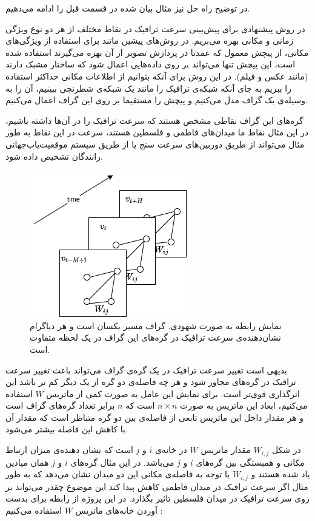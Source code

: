 
در توضیح راه حل نیز مثال بیان شده در قسمت قبل را ادامه می‌دهیم.

در روش پیشنهادی برای پیش‌بینی سرعت ترافیک در نقاط مختلف از هر دو نوع ویژگی زمانی و مکانی بهره می‌بریم.
در روش‌های پیشین مانند  برای استفاده از ویژگی‌های مکانی، از پیچش معمول که عمدتا در پردازش تصویر از آن بهره می‌گیرند استفاده شده است، این پیچش تنها می‌تواند بر روی داده‌هایی اعمال شود که ساختار مشبک دارند (مانند عکس و فیلم).
در این روش برای آنکه بتوانیم از اطلاعات مکانی حداکثر استفاده را ببریم به جای آنکه شبکه‌ی ترافیک را مانند یک شبکه‌‌ی شطرنجی ببینیم،
آن را به وسیله‌ی یک گراف مدل می‌کنیم و پیچش را مستقیما بر روی این گراف اعمال می‌کنیم.

گره‌های این گراف نقاطی مشخص هستند که سرعت ترافیک را در آن‌ها داشته باشیم، در این مثال نقاط ما میدان‌های فاطمی و فلسطین هستند،
سرعت در این نقاط به طور مثال می‌تواند از طریق دوربین‌های سرعت سنج یا از طریق سیستم موقعیت‌‌یاب‌جهانی رانندگان تشخیص داده شود.

\begin{figure}
  \includegraphics{./images/base.png}
  \centering
  \caption{
نمایش رابطه  به صورت شهودی.
گراف مسیر یکسان است و هر دیاگرام نشان‌دهنده‌ی سرعت ترافیک در گره‌های این گراف در یک لحظه متفاوت است.
}
  \label{fig:base}
\end{figure}

بدیهی است تغییر سرعت ترافیک در یک گره‌ی گراف می‌تواند باعث تغییر سرعت ترافیک در گره‌های مجاور شود و هر چه فاصله‌ی دو گره از یک دیگر کم تر باشد این اثرگذاری قوی‌تر است.
برای نمایش این عامل به صورت کمی از ماتریس $W$ استفاده می‌کنیم، ابعاد این ماتریس به صورت $n \times n$ است که $n$ برابر تعداد گره‌های گراف است و هر مقدار داخل این ماتریس تابعی از فاصله‌ی بین دو گره متناظر است که مقدار آن با کاهش این فاصله بیشتر می‌شود.

در شکل  $W_{i,j}$ مقدار ماتریس $W$ در خانه‌ی $i$ و $j$ است که نشان دهنده‌ی میزان ارتباط مکانی و همبستگی بین گره‌های $i$ و $j$ می‌باشد.
در این مثال گره‌های $i$ و $j$ همان میادین یاد شده هستند و $W_{i,j}$ با توجه به فاصله‌ی مکانی این دو میدان نشان می‌دهد که
به طور مثال اگر سرعت ترافیک در میدان فاطمی کاهش پیدا کند این موضوع چقدر می‌تواند بر روی سرعت ترافیک در میدان فلسطین تاثیر بگذارد.
در این پروژه از رابطه‌  برای بدست آوردن خانه‌های ماتریس $W$ استفاده می‌کنیم :

